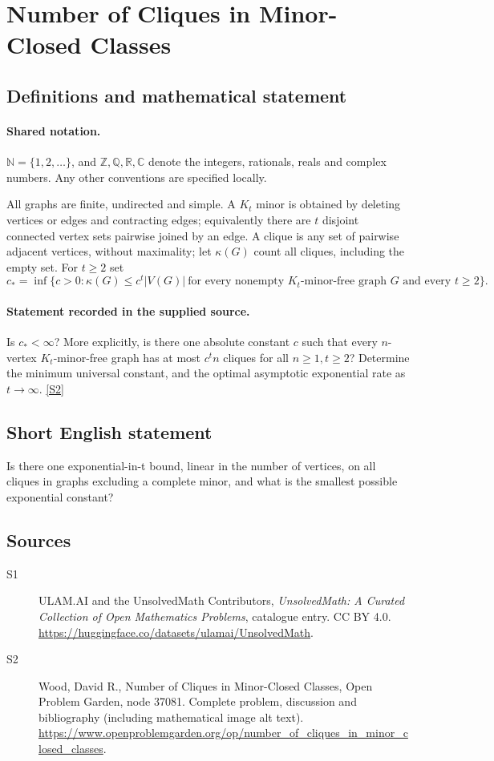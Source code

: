 \documentclass[11pt]{book}
\newcommand{\sref}[2]{\hyperlink{source:#1:#2}{[S#2]}}
\begin{document}
\section{Number of Cliques in Minor-Closed Classes}\label{statement}

\subsection{Definitions and mathematical statement}

\paragraph{Shared notation.}$\mathbb N=\{1,2,\ldots\}$, and $\mathbb Z,\mathbb Q,\mathbb R,\mathbb C$ denote the integers, rationals, reals and complex numbers. Any other conventions are specified locally.


All graphs are finite, undirected and simple. A $K_t$ minor is obtained by deleting vertices or edges and contracting edges; equivalently there are $t$ disjoint connected vertex sets pairwise joined by an edge. A clique is any set of pairwise adjacent vertices, without maximality; let $\kappa(G)$ count all cliques, including the empty set. For $t\geq2$ set
\[c_* =\inf\bigl\{c>0:\kappa(G)\leq c^t|V(G)|\ \text{for every nonempty }K_t\text{-minor-free graph }G\text{ and every }t\geq2\bigr\}.\]
\paragraph{Statement recorded in the supplied source.}
Is $c_*<\infty$? More explicitly, is there one absolute constant $c$ such that every $n$-vertex $K_t$-minor-free graph has at most $c^t n$ cliques for all $n\geq1,t\geq2$? Determine the minimum universal constant, and the optimal asymptotic exponential rate as $t\to\infty$. \sref{statement}{2}
\subsection{Short English statement}
Is there one exponential-in-t bound, linear in the number of vertices, on all cliques in graphs excluding a complete minor, and what is the smallest possible exponential constant?
\subsection{Sources}
\begin{description}
\item[\hypertarget{source:statement:1}{S1}] ULAM.AI and the UnsolvedMath Contributors, \emph{UnsolvedMath: A Curated Collection of Open Mathematics Problems}, catalogue entry. CC BY 4.0. \url{https://huggingface.co/datasets/ulamai/UnsolvedMath}.
\item[\hypertarget{source:statement:2}{S2}] Wood, David R., Number of Cliques in Minor-Closed Classes, Open Problem Garden, node 37081. Complete problem, discussion and bibliography (including mathematical image alt text). \url{https://www.openproblemgarden.org/op/number_of_cliques_in_minor_closed_classes}.
\end{description}
\label{end:statement}
\end{document}
